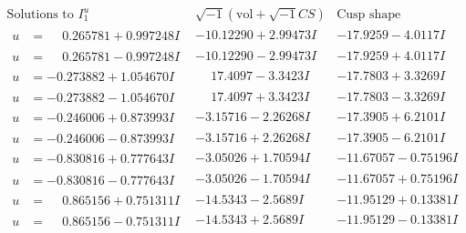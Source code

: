 \documentclass[1p]{elsarticle_modified}
\theoremstyle{definition}
\newcommand{\I}{\sqrt{-1}}
\begin{document}
$$\begin{array}{c|c|c}  
\text{Solutions to }I^u_{1}& \I (\text{vol} + \sqrt{-1}CS) & \text{Cusp shape}\\
 \hline 
\begin{aligned}
u &= \phantom{-}0.265781 + 0.997248 I\end{aligned}
 & -10.12290 + 2.99473 I & -17.9259 - 4.0117 I \\ \hline\begin{aligned}
u &= \phantom{-}0.265781 - 0.997248 I\end{aligned}
 & -10.12290 - 2.99473 I & -17.9259 + 4.0117 I \\ \hline\begin{aligned}
u &= -0.273882 + 1.054670 I\end{aligned}
 & \phantom{-}17.4097 - 3.3423 I & -17.7803 + 3.3269 I \\ \hline\begin{aligned}
u &= -0.273882 - 1.054670 I\end{aligned}
 & \phantom{-}17.4097 + 3.3423 I & -17.7803 - 3.3269 I \\ \hline\begin{aligned}
u &= -0.246006 + 0.873993 I\end{aligned}
 & -3.15716 - 2.26268 I & -17.3905 + 6.2101 I \\ \hline\begin{aligned}
u &= -0.246006 - 0.873993 I\end{aligned}
 & -3.15716 + 2.26268 I & -17.3905 - 6.2101 I \\ \hline\begin{aligned}
u &= -0.830816 + 0.777643 I\end{aligned}
 & -3.05026 + 1.70594 I & -11.67057 - 0.75196 I \\ \hline\begin{aligned}
u &= -0.830816 - 0.777643 I\end{aligned}
 & -3.05026 - 1.70594 I & -11.67057 + 0.75196 I \\ \hline\begin{aligned}
u &= \phantom{-}0.865156 + 0.751311 I\end{aligned}
 & -14.5343 - 2.5689 I & -11.95129 + 0.13381 I \\ \hline\begin{aligned}
u &= \phantom{-}0.865156 - 0.751311 I\end{aligned}
 & -14.5343 + 2.5689 I & -11.95129 - 0.13381 I \\ \hline\begin{aligned}

\end{aligned}
\end{array}$$
\end{document}

